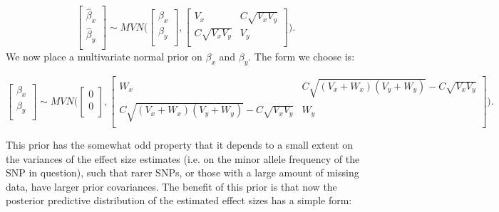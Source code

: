 \documentclass[11pt,titlepage]{article}
\begin{document}
\begin{equation}
     \begin{bmatrix}
    \hat \beta_x        \\[0.3em]
      \hat \beta_y     \\[0.3em]
     \end{bmatrix}
     \sim 
     MVN \bigg( 
          \begin{bmatrix}
     \beta_x        \\[0.3em]
       \beta_y     \\[0.3em]
     \end{bmatrix}
     , 
        \begin{bmatrix}
     V_x  & C\sqrt{V_x V_y}  \\[0.3em]
       C\sqrt{V_x V_y}  & V_y    \\[0.3em]
     \end{bmatrix}
 \bigg).
\end{equation}
We now place a multivariate normal prior on $\beta_x$ and $\beta_y$. The form we choose is:

\begin{equation}
    \begin{bmatrix}
     \beta_x        \\[0.3em]
      \beta_y     \\[0.3em]
     \end{bmatrix}
     \sim 
     MVN \bigg( 
          \begin{bmatrix}
     0       \\[0.3em]
      0     \\[0.3em]
     \end{bmatrix}
     , 
        \begin{bmatrix}
     W_x  & C \sqrt{ (V_x+W_x)(V_y+W_y)} - C \sqrt{V_x V_y}     \\[0.3em]
     C \sqrt{ (V_x+W_x)(V_y+W_y)} - C \sqrt{V_x V_y}     & W_y    \\[0.3em]
     \end{bmatrix}
 \bigg).
\end{equation}

This prior has the somewhat odd property that it depends to a small extent on the variances of the effect size estimates (i.e. on the minor allele frequency of the SNP in question), such that rarer SNPs, or those with a large amount of missing data, have larger prior covariances. The benefit of this prior is that now the posterior predictive distribution of the estimated effect sizes has a simple form:
\end{document}
